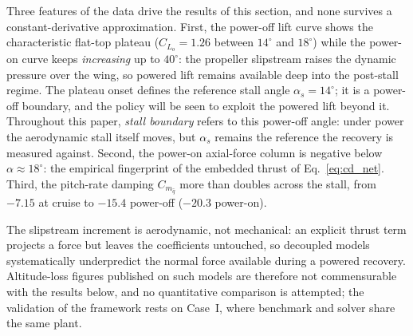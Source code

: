 \documentclass[journal ]{new-aiaa}
\begin{document}
Three features of the data drive the results of this section, and
none survives a constant-derivative approximation. First, the
power-off lift curve shows the characteristic flat-top plateau
($C_{L_o} = 1.26$ between $14^\circ$ and $18^\circ$) while the
power-on curve keeps \emph{increasing} up to $40^\circ$: the
propeller slipstream raises the dynamic pressure over the wing, so
powered lift remains available deep into the post-stall regime. The
plateau onset defines the reference stall angle
$\alpha_s = 14^\circ$; it is a power-off boundary, and the policy
will be seen to exploit the powered lift beyond it. Throughout this
paper, \emph{stall boundary} refers to this power-off angle: under
power the aerodynamic stall itself moves, but $\alpha_s$ remains the
reference the recovery is measured against. Second, the
power-on axial-force column is negative below
$\alpha \approx 18^\circ$: the empirical fingerprint of the embedded
thrust of Eq.~\eqref{eq:cd_net}. Third, the pitch-rate damping
$C_{m_{\hat{q}}}$ more than doubles across the stall, from $-7.15$
at cruise to $-15.4$ power-off ($-20.3$ power-on).

The slipstream increment is aerodynamic, not mechanical: an explicit
thrust term projects a force but leaves the coefficients untouched,
so decoupled models systematically underpredict the normal force
available during a powered recovery. Altitude-loss figures published
on such models \cite{Grillo2023} are therefore not commensurable
with the results below, and no quantitative comparison is attempted;
the validation of the framework rests on Case~I, where benchmark and
solver share the same plant.
\end{document}
